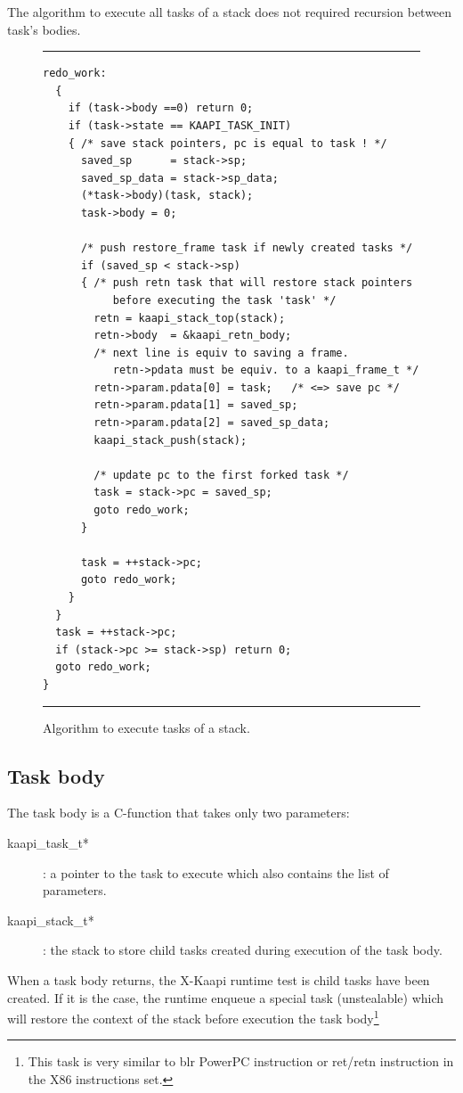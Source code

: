 \documentclass[12pt]{report}
\newcommand{\kaapi}{\textsc{X}-Kaapi\xspace}
\begin{document}
The algorithm to execute all tasks of a stack does not required recursion between task's bodies. 
\begin{figure}
\hrule
{\small
\begin{verbatim}
redo_work: 
  {
    if (task->body ==0) return 0;
    if (task->state == KAAPI_TASK_INIT) 
    { /* save stack pointers, pc is equal to task ! */
      saved_sp      = stack->sp;
      saved_sp_data = stack->sp_data;
      (*task->body)(task, stack);
      task->body = 0;
    
      /* push restore_frame task if newly created tasks */
      if (saved_sp < stack->sp) 
      { /* push retn task that will restore stack pointers 
           before executing the task 'task' */
        retn = kaapi_stack_top(stack);
        retn->body  = &kaapi_retn_body;
        /* next line is equiv to saving a frame. 
           retn->pdata must be equiv. to a kaapi_frame_t */
        retn->param.pdata[0] = task;   /* <=> save pc */
        retn->param.pdata[1] = saved_sp; 
        retn->param.pdata[2] = saved_sp_data;
        kaapi_stack_push(stack);

        /* update pc to the first forked task */
        task = stack->pc = saved_sp;
        goto redo_work;
      }
       
      task = ++stack->pc;
      goto redo_work;
    }
  }
  task = ++stack->pc;
  if (stack->pc >= stack->sp) return 0;
  goto redo_work;
}
\end{verbatim}
}
\hrule
\caption{Algorithm to execute tasks of a stack.}
\label{fig:stackalgo}
\end{figure}

\subsection{Task body}

The task body is a C-function that takes only two parameters:
\begin{description}
\item [kaapi\_task\_t*]: a pointer to the task to execute which also contains the list of parameters.
\item [kaapi\_stack\_t*]: the stack to store child  tasks created during execution of the task body.
\end{description}

When a task body returns, the \kaapi runtime test is child tasks have been created.
If it is the case, the runtime enqueue a special task (unstealable) which will restore the
context of the stack before execution the task body\footnote{This task is very similar to blr PowerPC instruction or ret/retn instruction in the X86 instructions set.}
\end{document}

